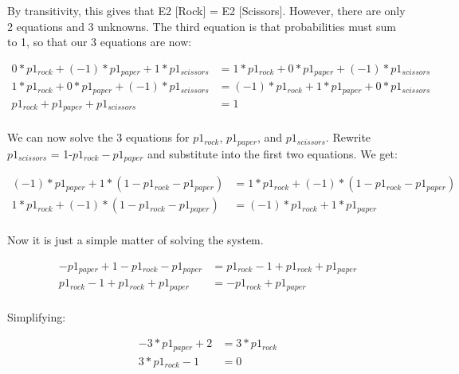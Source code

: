 \documentclass[15pt]{article}
\begin{document}
\begin{enumerate}
By transitivity, this gives that E2 [Rock] = E2 [Scissors]. However, there are only 2 equations and 3
unknowns. The third equation is that probabilities must sum to 1, so that our 3 equations are now:

\begin{equation} \label{eq3}
\begin{split}
0*p1_{rock}+(-1)*p1_{paper}+1*p1_{scissors} 
& =1*p1_{rock}+0*p1_{paper}+(-1)*p1_{scissors}\\
1*p1_{rock}+0*p1_{paper}+(-1)*p1_{scissors}
& =(-1)*p1_{rock}+1*p1_{paper}+0*p1_{scissors}\\
p1_{rock}+p1_{paper}+p1_{scissors}&=1\\
\end{split}
\end{equation}

We can now solve the 3 equations for $p1_{rock}$, $p1_{paper}$, and $p1_{scissors}$. Rewrite $p1_{scissors}$ = 1-$p1_{rock} - p1_{paper}$
and substitute into the first two equations. We get:

\begin{equation} \label{eq4}
\begin{split}
(-1)*p1_{paper}+1*(1-p1_{rock} - p1_{paper}) 
& =1*p1_{rock}+(-1)*(1-p1_{rock} - p1_{paper})\\
1*p1_{rock}+(-1)*(1-p1_{rock} - p1_{paper})
& =(-1)*p1_{rock}+1*p1_{paper}\\
\end{split}
\end{equation}

Now it is just a simple matter of solving the system.

\begin{equation} \label{eq5}
\begin{split}
-p1_{paper}+1-p1_{rock} - p1_{paper} 
& =p1_{rock}-1+p1_{rock} +p1_{paper}\\
p1_{rock}-1+p1_{rock} +p1_{paper}
& =-p1_{rock}+p1_{paper}\\
\end{split}
\end{equation}

Simplifying:

\begin{equation} \label{eq6}
\begin{split}
-3*p1_{paper}+2 
& =3*p1_{rock}\\
3*p1_{rock}-1&=0\\
\end{split}
\end{equation}


\end{enumerate}
\end{document}
